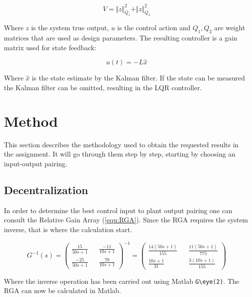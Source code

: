 \documentclass[a4paper, titlepage]{article}
\begin{document}
\begin{equation}
V = \Vert z \Vert^2_{Q_1} + \Vert z \Vert^2_{Q_2}
\end{equation}

Where $z$ is the system true output, $u$ is the control action and $Q_1, Q_2$ are weight matrices that are used as design parameters.
The resulting controller is a gain matrix used for state feedback:

\begin{equation}
u(t) = -L\hat{x}
\end{equation}

Where $\hat{x}$ is the state estimate by the Kalman filter.
If the state can be measured the Kalman filter can be omitted, resulting in the LQR controller.
\citep[~p.242-247]{glad00}

\section{Method}
This section describes the methodology used to obtain the requested results in the assignment.
It will go through them step by step, starting by choosing an input-output pairing.

\subsection{Decentralization}
In order to determine the best control input to plant output pairing one can consult the Relative Gain Array (\ref{equ:RGA}).
Since the RGA requires the system inverse, that is where the calculation start.

\begin{equation}
G^{-1}(s) = 
\begin{pmatrix}
\frac{15}{50s + 1} && \frac{-11}{10s + 1} \\[6pt]
\frac{-25}{50s + 1} && \frac{70}{10s + 1}
\end{pmatrix}^{-1} = 
\begin{pmatrix}
\frac{14(50s + 1)}{155} && \frac{11(50s + 1)}{775} \\[6pt]
\frac{10s + 1}{31} && \frac{3(10s + 1)}{155}
\end{pmatrix}
\label{equ:inverse}
\end{equation}

Where the inverse operation has been carried out using Matlab \verb|G\eye(2)|.
The RGA can now be calculated in Matlab.
\end{document}
